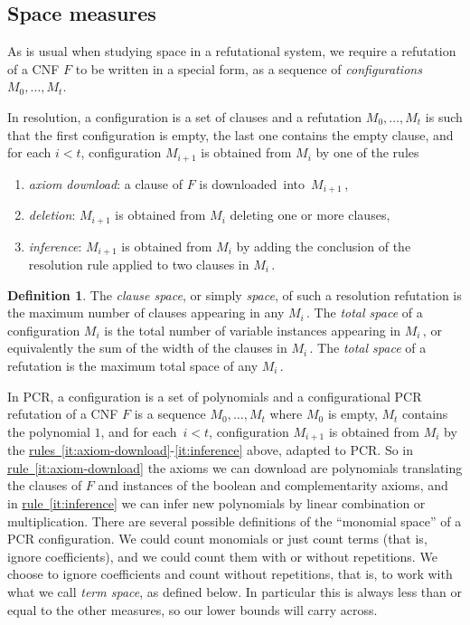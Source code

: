 \documentclass[11pt]{article}
\numberwithin{equation}{section}
\theoremstyle{definition}
\newtheorem{definition}[theorem]{Definition}
\theoremstyle{plain}
\newcommand{\expref}[2]{\hyperref[#2]{#1~\ref{#2}}}
\begin{document}
\subsection{Space measures} \label{sec:space_intro}
As is usual when studying space in a refutational system, we require a  refutation of a CNF $F$  to be 
written in a special form, as 
a sequence of \emph{configurations}  $M_0, \dots, M_t$. 

In resolution, a configuration is a set of clauses and a refutation  $M_0, \dots, M_t$ is such that the first configuration is empty, the last one contains the empty clause,
 and for each $i<t$, configuration 
 $M_{i+1}$ is obtained from $M_{i}$ by one of the rules
\begin{enumerate}[(1)]
\item\label{it:axiom-download}
\emph{axiom download}: a clause of $F$  is downloaded~into~$M_{i+1}$\,,
\item
\emph{deletion}: $M_{i+1}$ is obtained from $M_i$ deleting one or more clauses, 
\item\label{it:inference}
\emph{inference}:  $M_{i+1}$ is obtained from $M_i$ by adding the conclusion of  the  resolution rule applied to two clauses in $M_i$\,.
\end{enumerate}

\begin{definition}
The \emph{clause space}, or simply \emph{space}, of such a resolution refutation
is the maximum number of clauses appearing in any $M_i$\,.
The \emph{total space} of a configuration $M_i$ is the total number of variable instances appearing in $M_i$\,,
or equivalently the sum of the width of the clauses in $M_i$\,. The \emph{total space} of a refutation 
is the maximum total space of any $M_i$\,.
\end{definition}

In PCR, a configuration is a set of polynomials and a configurational PCR refutation of a CNF $F$ is a sequence 
$M_0, \dots, M_t$ where $M_0$ is empty, $M_t$ contains the polynomial $1$, and for each~$i<t$,
configuration 
$M_{i+1}$ is obtained from $M_i$ by
the \expref{rules}{it:axiom-download}-\ref{it:inference} above, adapted to PCR.
So in \expref{rule}{it:axiom-download} 
the axioms we can download
 are polynomials translating the clauses of $F$ and instances of the boolean and complementarity axioms,
 and in \expref{rule}{it:inference} we can infer new polynomials by linear combination or multiplication.
 There are several possible definitions of the ``monomial space'' of a PCR configuration. 
We could count monomials or just count terms (that is, ignore coefficients),
 and we could count them with or without repetitions.
We choose to ignore coefficients and count without repetitions,
that is, to work with what we call \emph{term space}, as defined below. In
particular this is always less than or equal to the other measures, so our lower bounds will carry across.
\end{document}
